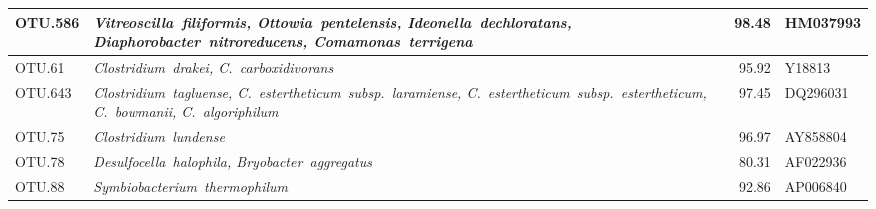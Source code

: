\begin{table}[H]
{\begin{tabular}{l>{\itshape}p{10cm}rl}
OTU.586 & Vitreoscilla~filiformis, Ottowia~pentelensis, Ideonella~dechloratans, Diaphorobacter~nitroreducens, Comamonas~terrigena & 98.48 & HM037993 \\ \midrule
OTU.61 & Clostridium~drakei, C.~carboxidivorans & 95.92 & Y18813 \\ \midrule
OTU.643 & Clostridium~tagluense, C.~estertheticum~subsp.~laramiense, C.~estertheticum~subsp.~estertheticum, C.~bowmanii, C.~algoriphilum & 97.45 & DQ296031 \\ \midrule
OTU.75 & Clostridium~lundense & 96.97 & AY858804 \\ \midrule
OTU.78 & Desulfocella~halophila, Bryobacter~aggregatus & 80.31 & AF022936 \\ \midrule
OTU.88 & Symbiobacterium~thermophilum & 92.86 & AP006840 \\ \midrule

    \bottomrule
\end{tabular}}{}
\end{table}
